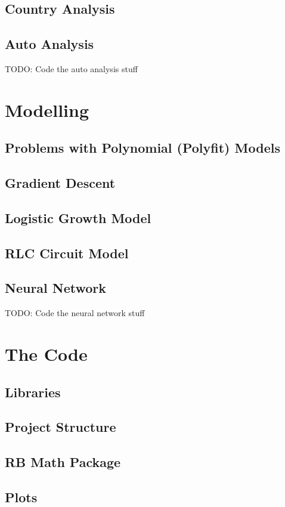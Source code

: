 \documentclass{report}
\begin{document}
        \subsection{Country Analysis}
        \subsection{Auto Analysis}
            TODO: Code the auto analysis stuff
    \section{Modelling}
        \subsection{Problems with Polynomial (Polyfit) Models}
        \subsection{Gradient Descent}
        \subsection{Logistic Growth Model}
        \subsection{RLC Circuit Model}
        \subsection{Neural Network}
            TODO: Code the neural network stuff
    \section{The Code}
        \subsection{Libraries}
        \subsection{Project Structure}
        \subsection{RB Math Package}
        \subsection{Plots}
\end{document}
